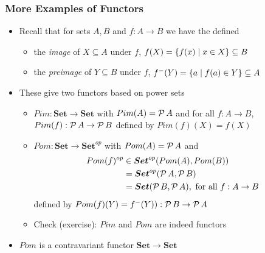 \documentclass[handout]{beamer}
\newcommand{\bfsf}[1]{{\boldsymbol{#1}}}
\newcommand{\Set}{\bfsf{Set}}
\begin{document}
\frame
  {   
    \frametitle{More Examples of Functors}\label{Ch2:MoreExaFunctors}

 \begin{itemize}[<+->]
\item Recall that for sets $A,B$ and $f: A\to B$ we have the defined
   \begin{itemize}[<+->]
\item the \emph{image} of  $X\subseteq A$ under $f$,
$f(X)=\{f(x)\mid x\in X\} \subseteq B$ 
\item the \emph{preimage} of  $Y{\subseteq} B$ under $f$,
$f^-(Y)=\{a \mid f(a)\in Y\} \subseteq A$ 
   \end{itemize}
\item These give two functors based on power sets
   \begin{itemize}[<+->]
\item $Pim:\Set\to\Set$ with $Pim(A) = \operatorname{\mathcal{P}} A$ and for all $f:A\to B$,
$Pim(f) : \operatorname{\mathcal{P}} A \to\operatorname{\mathcal{P}} B$ defined by $Pim(f)(X) = f(X)$
\item $Pom:\Set\to\Set^{op}$ with $Pom(A) = \operatorname{\mathcal{P}} A$ and %
\begin{align*}
Pom(f)^{op} &\in \Set^{op}(Pom(A),Pom(B))\\ & =  \Set^{op}(\powset A,\powset B) \\&=
\Set(\powset B,\powset A), \text{~for all $f:A\to B$}
\end{align*} defined by 
$Pom(f)(Y)= f^-(Y)): \operatorname{\mathcal{P}} B \to\operatorname{\mathcal{P}} A$
\item Check (exercise): $Pim$ and $Pom$ are indeed functors %
   \end{itemize}
\item $Pom$ is a contravariant functor $\Set\to\Set$
 \end{itemize}

 }
\end{document}
